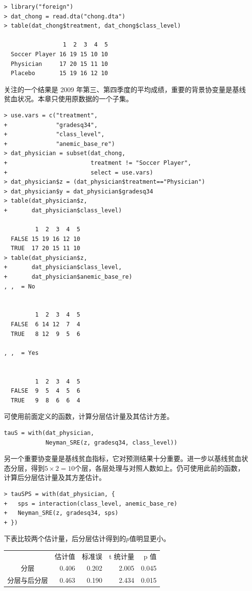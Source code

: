 \begin{lstlisting}
> library("foreign")
> dat_chong = read.dta("chong.dta")
> table(dat_chong$treatment, dat_chong$class_level)
               
                 1  2  3  4  5
  Soccer Player 16 19 15 10 10
  Physician     17 20 15 11 10
  Placebo       15 19 16 12 10
\end{lstlisting}

关注的一个结果是 2009 年第三、第四季度的平均成绩，重要的背景协变量是基线贫血状况。本章只使用原数据的一个子集。 

\begin{lstlisting}
> use.vars = c("treatment", 
+              "gradesq34", 
+              "class_level", 
+              "anemic_base_re")
> dat_physician = subset(dat_chong,
+                        treatment != "Soccer Player",
+                        select = use.vars)
> dat_physician$z = (dat_physician$treatment=="Physician")
> dat_physician$y = dat_physician$gradesq34
> table(dat_physician$z, 
+       dat_physician$class_level)
       
         1  2  3  4  5
  FALSE 15 19 16 12 10
  TRUE  17 20 15 11 10
> table(dat_physician$z, 
+       dat_physician$class_level,
+       dat_physician$anemic_base_re)
, ,  = No

       
         1  2  3  4  5
  FALSE  6 14 12  7  4
  TRUE   8 12  9  5  6

, ,  = Yes

       
         1  2  3  4  5
  FALSE  9  5  4  5  6
  TRUE   9  8  6  6  4
\end{lstlisting}

 
可使用前面定义的函数，计算分层估计量及其估计方差。 
\begin{lstlisting}
tauS = with(dat_physician,
            Neyman_SRE(z, gradesq34, class_level))
\end{lstlisting}

另一个重要协变量是基线贫血指标，它对预测结果十分重要。进一步以基线贫血状态分层，得到$5\times 2 =10$个层，各层处理与对照人数如上。仍可使用此前的函数，计算后分层估计量及其方差估计。 
 \begin{lstlisting}
> tauSPS = with(dat_physician, {
+   sps = interaction(class_level, anemic_base_re)
+   Neyman_SRE(z, gradesq34, sps)
+ })
\end{lstlisting}

下表比较两个估计量，后分层估计得到的$p$值明显更小。 
\begin{center}
\begin{tabular}{crrrr}
                          & 估计值 &   标准误 &t 统计量& p 值 \\
分层                & 0.406 &0.202 & 2.005  & 0.045 \\
分层与后分层 & 0.463 &0.190 & 2.434 &  0.015
\end{tabular}
\end{center} 


